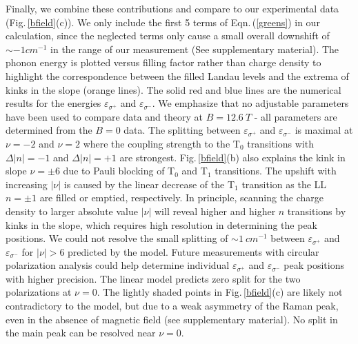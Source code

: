 \documentclass[prl,aps,superscriptaddress,showpacs,reprint]{revtex4-1}
\begin{document}
Finally, we combine these contributions and compare to our experimental data (Fig.\,\ref{bfield}(c)). We only include the first 5 terms of Eqn.\,(\ref{greens}) in our calculation, since the neglected terms only cause a small overall downshift of $\sim -1cm^{-1}$ in the range of our measurement (See supplementary material). The phonon energy is plotted versus filling factor rather than charge density to highlight the correspondence between the filled Landau levels and the extrema of kinks in the slope (orange lines). The solid red and blue lines are the numerical results for the energies $\varepsilon_{\sigma^+}$ and $\varepsilon_{\sigma^-}$. We emphasize that no adjustable parameters have been used to compare data and theory at $B=12.6\: T$ -  all parameters are determined from the $B=0$ data.
The splitting between $\varepsilon_{\sigma^+}$ and $\varepsilon_{\sigma^-}$ is maximal at $\nu=-2$ and $\nu=2$ where the coupling strength to the T$_0$ transitions with $\Delta|n|=-1$ and $\Delta|n|=+1$  are strongest. Fig.\,\ref{bfield}(b) also explains the kink in slope $\nu=\pm6$ due to Pauli blocking of T$_0$ and T$_1$ transitions. The upshift with increasing $|\nu|$ is caused by the linear decrease of the T$_1$ transition as the LL $n=\pm1 $ are filled or emptied, respectively. In principle, scanning the charge density to larger absolute value $|\nu|$ will reveal higher and higher $n$ transitions by kinks in the slope, which requires high resolution in determining the peak positions. 
We could not resolve the small splitting of $\sim 1\: cm^{-1}$ between $\varepsilon_{\sigma^+}$ and $\varepsilon_{\sigma^-}$ for $\left|\nu\right|>6$ predicted by the model. Future measurements with circular polarization analysis could help determine individual $\varepsilon_{\sigma^+}$ and $\varepsilon_{\sigma^-}$ peak positions with higher precision.
The linear model predicts zero split for the two polarizations at $\nu=0$. The lightly shaded points in Fig.\,\ref{bfield}(c) are likely not contradictory to the model, but due to a weak asymmetry of the Raman peak, even in the absence of magnetic field (see supplementary material). No split in the main peak can be resolved near $\nu=0$.
\end{document}
